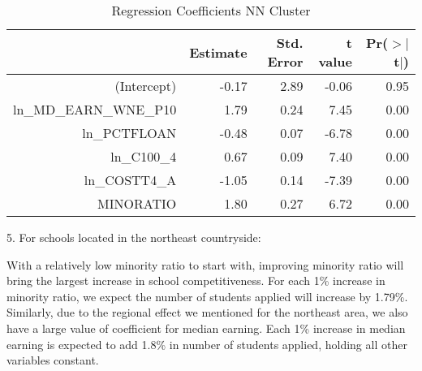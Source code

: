 \documentclass{article}
\begin{document}
\begin{Schunk}
\begin{Soutput}
\begin{table}[H]
\centering
\begin{tabular}{rrrrr}
  \hline
 & Estimate & Std. Error & t value & Pr($>$$|$t$|$) \\ 
  \hline
(Intercept) & -0.17 & 2.89 & -0.06 & 0.95 \\ 
  ln\_MD\_EARN\_WNE\_P10 & 1.79 & 0.24 & 7.45 & 0.00 \\ 
  ln\_PCTFLOAN & -0.48 & 0.07 & -6.78 & 0.00 \\ 
  ln\_C100\_4 & 0.67 & 0.09 & 7.40 & 0.00 \\ 
  ln\_COSTT4\_A & -1.05 & 0.14 & -7.39 & 0.00 \\ 
  MINORATIO & 1.80 & 0.27 & 6.72 & 0.00 \\ 
   \hline
\end{tabular}
\caption{Regression Coefficients NN Cluster} 
\end{table}
\end{Soutput}
\end{Schunk}

5. For schools located in the northeast countryside:

With a relatively low minority ratio to start with, improving minority ratio will bring the largest increase in school competitiveness. For each 1\% increase in minority ratio, we expect the number of students applied will increase by 1.79\%. Similarly, due to the regional effect we mentioned for the northeast area, we also have a large value of coefficient for median earning. Each 1\% increase in median earning is expected to add 1.8\% in number of students applied, holding all other variables constant.
\end{document}
